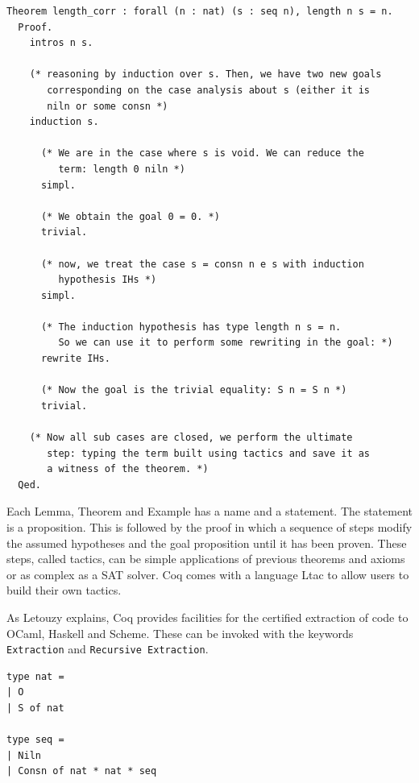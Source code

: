 \documentclass[12pt,twoside,notitlepage]{report}
\theoremstyle{plain}%
\theoremstyle{definition}
\theoremstyle{remark}
\begin{document}
\begin{minipage}{\linewidth}

\begin{lstlisting}[language={Coq},caption={Coq theorem example}]
Theorem length_corr : forall (n : nat) (s : seq n), length n s = n.
  Proof.
    intros n s.

    (* reasoning by induction over s. Then, we have two new goals
       corresponding on the case analysis about s (either it is 
       niln or some consn *)
    induction s.

      (* We are in the case where s is void. We can reduce the 
         term: length 0 niln *)
      simpl. 

      (* We obtain the goal 0 = 0. *)
      trivial.

      (* now, we treat the case s = consn n e s with induction 
         hypothesis IHs *)
      simpl. 

      (* The induction hypothesis has type length n s = n. 
         So we can use it to perform some rewriting in the goal: *)
      rewrite IHs. 

      (* Now the goal is the trivial equality: S n = S n *)
      trivial.

    (* Now all sub cases are closed, we perform the ultimate
       step: typing the term built using tactics and save it as
       a witness of the theorem. *)
  Qed.	  
\end{lstlisting}

\end{minipage}
Each Lemma, Theorem and Example has a name and a statement. The statement is a proposition. This is followed by the proof in which a sequence of steps modify the assumed hypotheses and the goal proposition until it has been proven. These steps, called tactics, can be simple applications of previous theorems and axioms or as complex as a SAT solver. Coq comes with a language Ltac to allow users to build their own tactics.


As Letouzy\cite{letouzey2008extraction} explains, Coq provides facilities for the certified extraction of code to OCaml, Haskell and Scheme. These can be invoked with the keywords \lstinline[language={Coq}]|Extraction| and \lstinline[language={Coq}]|Recursive Extraction|. 
\vspace{3mm}

\begin{minipage}{\linewidth}

\begin{lstlisting}[caption={Coq to OCaml extraction of seq}]
type nat =
| O
| S of nat

type seq =
| Niln
| Consn of nat * nat * seq
\end{lstlisting}

\end{minipage}
\end{document}
